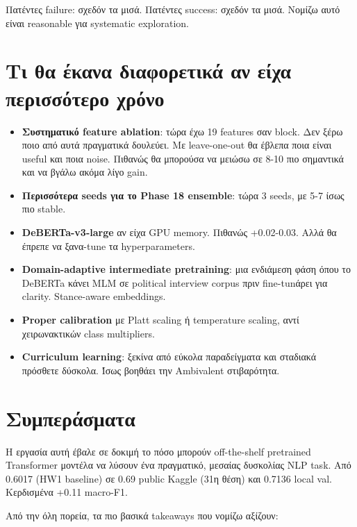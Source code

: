 \documentclass[12pt]{fphw}
\begin{document}
Πατέντες failure: σχεδόν τα μισά. Πατέντες success: σχεδόν τα μισά. Νομίζω αυτό είναι reasonable για systematic exploration.

\section{Τι θα έκανα διαφορετικά αν είχα περισσότερο χρόνο}

\begin{itemize}
    \item \textbf{Συστηματικό feature ablation}: τώρα έχω 19 features σαν block. Δεν ξέρω ποιο από αυτά πραγματικά δουλεύει. Με leave-one-out θα έβλεπα ποια είναι useful και ποια noise. Πιθανώς θα μπορούσα να μειώσω σε 8-10 πιο σημαντικά και να βγάλω ακόμα λίγο gain.
    \item \textbf{Περισσότερα seeds για το Phase 18 ensemble}: τώρα 3 seeds, με 5-7 ίσως πιο stable.
    \item \textbf{DeBERTa-v3-large} αν είχα GPU memory. Πιθανώς +0.02-0.03. Αλλά θα έπρεπε να ξανα-tune τα hyperparameters.
    \item \textbf{Domain-adaptive intermediate pretraining}: μια ενδιάμεση φάση όπου το DeBERTa κάνει MLM σε political interview corpus πριν fine-tunάρει για clarity. Stance-aware embeddings.
    \item \textbf{Proper calibration} με Platt scaling ή temperature scaling, αντί χειρωνακτικών class multipliers.
    \item \textbf{Curriculum learning}: ξεκίνα από εύκολα παραδείγματα και σταδιακά πρόσθετε δύσκολα. Ίσως βοηθάει την Ambivalent στιβαρότητα.
\end{itemize}

\section{Συμπεράσματα}

Η εργασία αυτή έβαλε σε δοκιμή το πόσο μπορούν off-the-shelf pretrained Transformer μοντέλα να λύσουν ένα πραγματικό, μεσαίας δυσκολίας NLP task. Από 0.6017 (HW1 baseline) σε 0.69 public Kaggle (31η θέση) και 0.7136 local val. Κερδισμένα +0.11 macro-F1.

Από την όλη πορεία, τα πιο βασικά takeaways που νομίζω αξίζουν:
\end{document}
